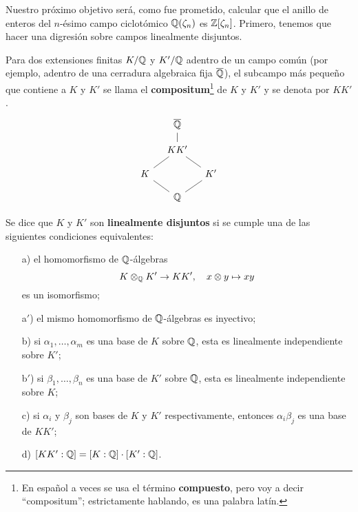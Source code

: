 Nuestro próximo objetivo será, como fue prometido, calcular que el anillo de
enteros del $n$-ésimo campo ciclotómico $\mathbb{Q} (\zeta_n)$ es
$\mathbb{Z} [\zeta_n]$. Primero, tenemos que hacer una digresión sobre campos
linealmente disjuntos.

\begin{definicion}
  Para dos extensiones finitas $K/\mathbb{Q}$ y $K'/\mathbb{Q}$ adentro de un campo común
  (por ejemplo, adentro de una cerradura algebraica fija $\overline{\mathbb{Q}}$),
  el subcampo más pequeño que contiene a $K$ y $K'$ se llama el
  \textbf{compositum}\footnote{En español a veces se usa el término
    \textbf{compuesto}, pero voy a decir ``compositum''; estrictamente hablando,
    es una palabra latín.} de $K$ y $K'$ y se denota por $K K'$.
  \[ \begin{tikzcd}[row sep=1em,column sep=1em]
    & \overline{\QQ}\ar[-]{d} \\
    & KK'\ar[-]{dl}\ar[-]{dr} \\
    K\ar[-]{dr} & & K'\ar[-]{dl} \\
    & \QQ
  \end{tikzcd} \]

  Se dice que $K$ y $K'$ son \textbf{linealmente disjuntos} si se cumple una
  de las siguientes condiciones equivalentes:
  \begin{enumerate}
  \item[a)] el homomorfismo de $\mathbb{Q}$-álgebras
    $$K\otimes_{\mathbb{Q}} K'\to K K', \quad x\otimes y \mapsto xy$$
    es un isomorfismo;

  \item[a${}'$)] el mismo homomorfismo de $\mathbb{Q}$-álgebras es inyectivo;

  \item[b)] si $\alpha_1, \ldots, \alpha_m$ es una base de $K$ sobre $\mathbb{Q}$,
    esta es linealmente independiente sobre $K'$;

  \item[b${}'$)] si $\beta_1, \ldots, \beta_n$ es una base de $K'$ sobre $\mathbb{Q}$,
    esta es linealmente independiente sobre $K$;

  \item[c)] si $\alpha_i$ y $\beta_j$ son bases de $K$ y $K'$ respectivamente,
    entonces $\alpha_i \beta_j$ es una base de $K K'$;

  \item[d)] $[KK' : \mathbb{Q}] = [K : \mathbb{Q}]\cdot [K' : \mathbb{Q}]$.
  \end{enumerate}
\end{definicion}

